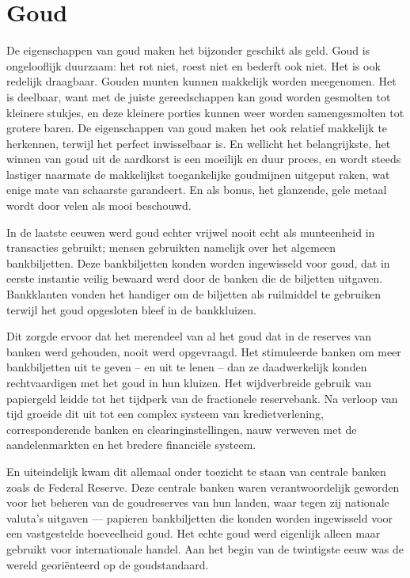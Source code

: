 \documentclass[smalldemyvopaper,11pt,twoside,onecolumn,openright,extrafontsizes,hidelinks]{memoir}
\begin{document}
\section{Goud}\label{goud}

De eigenschappen van goud maken het bijzonder geschikt als geld. Goud is
ongelooflijk duurzaam: het rot niet, roest niet en bederft ook niet. Het
is ook redelijk draagbaar. Gouden munten kunnen makkelijk worden
meegenomen. Het is deelbaar, want met de juiste gereedschappen kan goud
worden gesmolten tot kleinere stukjes, en deze kleinere porties kunnen
weer worden samengesmolten tot grotere baren. De eigenschappen van goud
maken het ook relatief makkelijk te herkennen, terwijl het perfect
inwisselbaar is. En wellicht het belangrijkste, het winnen van goud uit
de aardkorst is een moeilijk en duur proces, en wordt steeds lastiger
naarmate de makkelijkst toegankelijke goudmijnen uitgeput raken, wat
enige mate van schaarste garandeert. En als bonus, het glanzende, gele
metaal wordt door velen als mooi beschouwd.

In de laatste eeuwen werd goud echter vrijwel nooit echt als munteenheid
in transacties gebruikt; mensen gebruikten namelijk over het algemeen
bankbiljetten. Deze bankbiljetten konden worden ingewisseld voor goud,
dat in eerste instantie veilig bewaard werd door de banken die de
biljetten uitgaven. Bankklanten vonden het handiger om de biljetten als
ruilmiddel te gebruiken terwijl het goud opgesloten bleef in de
bankkluizen.

Dit zorgde ervoor dat het merendeel van al het goud dat in de reserves
van banken werd gehouden, nooit werd opgevraagd. Het stimuleerde banken
om meer bankbiljetten uit te geven -- en uit te lenen -- dan ze
daadwerkelijk konden rechtvaardigen met het goud in hun kluizen. Het
wijdverbreide gebruik van papiergeld leidde tot het tijdperk van de
fractionele reservebank. Na verloop van tijd groeide dit uit tot een
complex systeem van kredietverlening, corresponderende banken en
clearinginstellingen, nauw verweven met de aandelenmarkten en het
bredere financiële systeem.

En uiteindelijk kwam dit allemaal onder toezicht te staan van centrale
banken zoals de Federal Reserve. Deze centrale banken waren
verantwoordelijk geworden voor het beheren van de goudreserves van hun
landen, waar tegen zij nationale valuta's uitgaven --- papieren
bankbiljetten die konden worden ingewisseld voor een vastgestelde
hoeveelheid goud. Het echte goud werd eigenlijk alleen maar gebruikt
voor internationale handel. Aan het begin van de twintigste eeuw was de
wereld georiënteerd op de goudstandaard.
\end{document}
